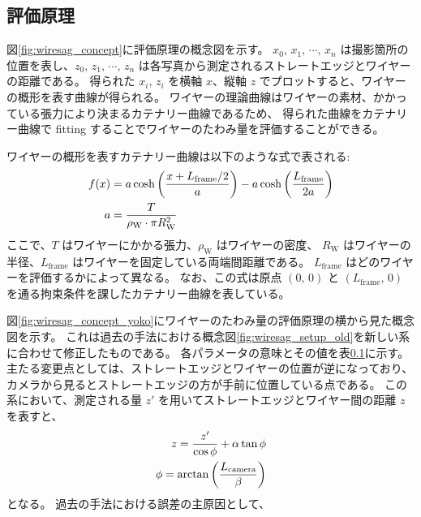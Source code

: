 \documentclass[../../main.tex]{subfiles}
\begin{document}
\subsection{評価原理}
図\ref{fig:wiresag_concept}に評価原理の概念図を示す。
$x_{0},\,x_{1},\,\cdots,\,x_{n}$ は撮影箇所の位置を表し、$z_{0},\,z_{1},\,\cdots,\,z_{n}$ は各写真から測定されるストレートエッジとワイヤーの距離である。
得られた $x_{i},\,z_{i}$ を横軸 $x$、縦軸 $z$ でプロットすると、ワイヤーの概形を表す曲線が得られる。
ワイヤーの理論曲線はワイヤーの素材、かかっている張力により決まるカテナリー曲線であるため、
得られた曲線をカテナリー曲線で fitting することでワイヤーのたわみ量を評価することができる。

ワイヤーの概形を表すカテナリー曲線は以下のような式で表される:
\begin{align}
    f(x) &= a\cosh\qty(\dfrac{x+L_{\mathrm{frame}}/2}{a}) - a\cosh\qty(\dfrac{L_{\mathrm{frame}}}{2a}) \\
    a &= \dfrac{T}{\rho_{\mathrm{W}}\cdot\pi R_{\mathrm{W}}^2}
\end{align}
ここで、$T$ はワイヤーにかかる張力、$\rho_{\mathrm{W}}$ はワイヤーの密度、
$R_{\mathrm{W}}$ はワイヤーの半径、$L_{\mathrm{frame}}$ はワイヤーを固定している両端間距離である。
$L_{\mathrm{frame}}$ はどのワイヤーを評価するかによって異なる。
なお、この式は原点 $(0,\,0)$ と $(L_{\mathrm{frame}},\,0)$ を通る拘束条件を課したカテナリー曲線を表している。

図\ref{fig:wiresag_concept_yoko}にワイヤーのたわみ量の評価原理の横から見た概念図を示す。
これは過去の手法における概念図\ref{fig:wiresag_setup_old}を新しい系に合わせて修正したものである。
各パラメータの意味とその値を表\ref{}に示す。
主たる変更点としては、ストレートエッジとワイヤーの位置が逆になっており、カメラから見るとストレートエッジの方が手前に位置している点である。
この系において、測定される量 $z'$ を用いてストレートエッジとワイヤー間の距離 $z$ を表すと、
\begin{align}
    z = \dfrac{z'}{\cos\phi} + \alpha\tan\phi \\
    \phi = \arctan\qty(\dfrac{L_{\mathrm{camera}}}{\beta})
\end{align}
となる。
過去の手法における誤差の主原因として、
\end{document}
